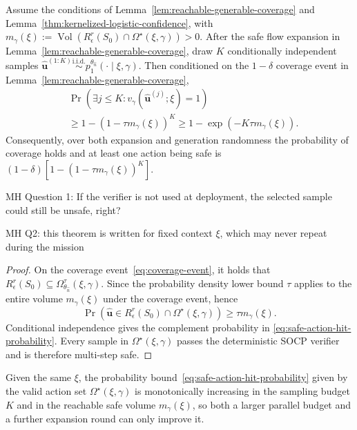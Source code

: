 \begin{itemize}[leftmargin=0pt, itemindent=0pt, label={}]
\begin{theorem}
\label{thm:safe-action-availability}
Assume the conditions of Lemma~\ref{lem:reachable-generable-coverage} and Lemma~\ref{thm:kernelized-logistic-confidence}, with $m_\gamma(\xi):=\operatorname{Vol}\!\left(R_\epsilon^r(S_0)\cap\Omega^\star(\xi,\gamma)\right)>0.$
After the safe flow expansion in
Lemma~\ref{lem:reachable-generable-coverage}, draw \(K\)
conditionally independent samples $\hat{\mathbf u}^{(1:K)}
\overset{\mathrm{i.i.d.}}{\sim}p_1^{\theta_{\hat n}}(\cdot\mid\xi,\gamma)$. Then conditioned on the \(1-\delta\) coverage event in Lemma~\ref{lem:reachable-generable-coverage},
\begin{align}
&\Pr\!\left(
\exists j\le K:
v_\gamma(\hat{\mathbf u}^{(j)};\xi)=1
\right)\\
&\ge
1-
\left(1-\tau m_\gamma(\xi)\right)^K
\ge
1-\exp\!\left(-K\tau m_\gamma(\xi)\right).
\label{eq:safe-action-hit-probability}
\end{align}
Consequently, over both expansion and generation randomness the probability of coverage holds and at least one action being safe is $(1-\delta)\left[1-\left(1-\tau m_\gamma(\xi)\right)^K\right].$
\end{theorem}
{\color{red} MH Question 1: If the verifier is not used at deployment, the selected sample could still be unsafe, right?}

{\color{red} MH Q2: this theorem is written for fixed context $\xi$, which may never repeat during the mission}

\begin{proof}
On the coverage event~\eqref{eq:coverage-event}, it holds that $
R_\epsilon^r(S_0)
\subseteq
\Omega_{\theta_{\hat n}}^\tau(\xi,\gamma).
$
Since the probability density lower bound $\tau$ applies to the entire volume $m_\gamma(\xi)$ under the coverage event, hence
\[
\Pr\!\left(
\hat{\mathbf u}\in
R_\epsilon^r(S_0)\cap\Omega^\star(\xi,\gamma)
\right)
\ge
\tau m_\gamma(\xi).
\]
Conditional independence gives the complement probability in
\eqref{eq:safe-action-hit-probability}. Every sample in
\(\Omega^\star(\xi,\gamma)\) passes the deterministic SOCP verifier
and is therefore multi-step safe.
\end{proof}
\begin{corollary}
    Given the same $\xi$, the probability bound~\eqref{eq:safe-action-hit-probability} given by the valid action set $\Omega^\star(\xi,\gamma)$ is monotonically {\color{blue} increasing in the sampling budget $K$ and in the reachable safe volume $m_\gamma(\xi)$, so both a larger parallel budget and a further expansion round can only improve it.}
\end{corollary}


\end{itemize}
